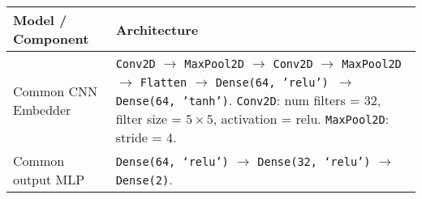 \begin{tabular}{p{}p{}}
    \toprule
    Model / Component & Architecture \\ \hline\hline
    Common CNN \newline Embedder & 
        \texttt{Conv2D} $\to$ \texttt{MaxPool2D} $\to$ \texttt{Conv2D} $\to$ \texttt{MaxPool2D} $\to$ \texttt{Flatten} $\to$ \texttt{Dense(64, 'relu') $\to$ \texttt{Dense(64, 'tanh')}}. \newline
        \texttt{Conv2D}: num filters = 32, filter size = $5 \times 5$, activation = relu. \newline
        \texttt{MaxPool2D}: stride = 4. \\\hline
    Common output MLP & \texttt{Dense(64, `relu')} $\to$ \texttt{Dense(32, `relu')} $\to$ \texttt{Dense(2)}. \\ \hline \hline


\end{tabular}
